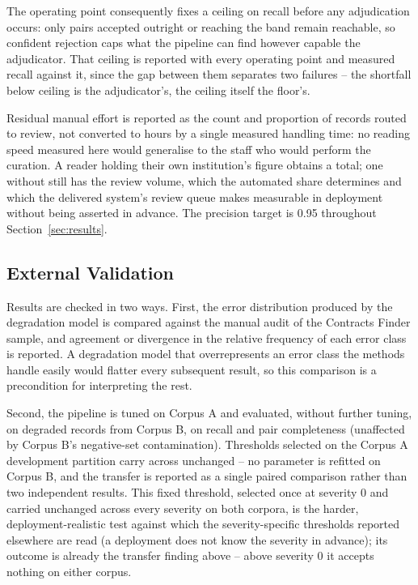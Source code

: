 \documentclass[conference]{IEEEtran}
\begin{document}
The operating point consequently fixes a ceiling on recall before any
adjudication occurs: only pairs accepted outright or reaching the band
remain reachable, so confident rejection caps what the pipeline can
find however capable the adjudicator. That ceiling is reported with
every operating point and measured recall against it, since the gap
between them separates two failures -- the shortfall below ceiling is
the adjudicator's, the ceiling itself the floor's.

Residual manual effort is reported as the count and proportion of
records routed to review, not converted to hours by a single measured
handling time: no reading speed measured here would generalise to the
staff who would perform the curation. A reader holding their own
institution's figure obtains a total; one without still has the review
volume, which the automated share determines and which the delivered
system's review queue makes measurable in deployment without being
asserted in advance. The precision target is 0.95 throughout
Section~\ref{sec:results}.

\subsection{External Validation}
\label{sec:external}

Results are checked in two ways. First, the error distribution produced
by the degradation model is compared against the manual audit of the
Contracts Finder sample, and agreement or divergence in the relative
frequency of each error class is reported. A degradation model that
overrepresents an error class the methods handle easily would flatter
every subsequent result, so this comparison is a precondition for
interpreting the rest.

Second, the pipeline is tuned on Corpus A and evaluated, without
further tuning, on degraded records from Corpus B, on recall and pair
completeness (unaffected by Corpus B's negative-set contamination).
Thresholds selected on the Corpus A development partition carry across
unchanged -- no parameter is refitted on Corpus B, and the transfer is
reported as a single paired comparison rather than two independent
results. This fixed threshold, selected once at severity 0 and carried
unchanged across every severity on both corpora, is the harder,
deployment-realistic test against which the severity-specific
thresholds reported elsewhere are read (a deployment does not know the
severity in advance); its outcome is already the transfer finding
above -- above severity 0 it accepts nothing on either corpus.
\end{document}
